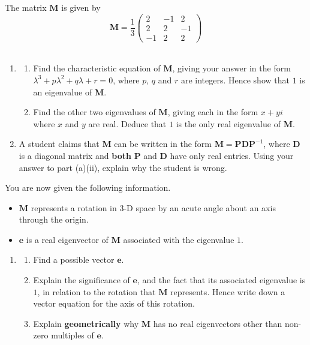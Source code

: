 \documentclass[leqno]{article}
\begin{document}
\begin{enumerate}[
  label=\textbf{\arabic*.},
  leftmargin=*,
  topsep=0pt,
  partopsep=0pt,
  parsep=0pt
]
The matrix $\mathbf{M}$ is given by
\[\mathbf{M} = \dfrac{1}{3}\begin{pmatrix} 2 & -1 & 2 \\ 2 & 2 & -1 \\ -1 & 2 & 2 \end{pmatrix}\] \\
\begin{enumerate}[label=\textbf{(\alph*)}]
  \item
  \begin{enumerate}[label=(\roman*)]
    \item Find the characteristic equation of $\mathbf{M}$, giving your answer in the form $\lambda^3 + p\lambda^2 + q\lambda + r = 0$, where $p$, $q$ and $r$ are integers. Hence show that $1$ is an eigenvalue of $\mathbf{M}$. 
    \item Find the other two eigenvalues of $\mathbf{M}$, giving each in the form $x + yi$ where $x$ and $y$ are real. Deduce that $1$ is the only real eigenvalue of $\mathbf{M}$.  \\
  \end{enumerate}
  \item A student claims that $\mathbf{M}$ can be written in the form $\mathbf{M} = \mathbf{P}\mathbf{D}\mathbf{P}^{-1}$, where $\mathbf{D}$ is a diagonal matrix and \textbf{both} $\mathbf{P}$ and $\mathbf{D}$ have only real entries. Using your answer to part (a)(ii), explain why the student is wrong.  \\
\end{enumerate}
You are now given the following information.
\begin{itemize}
  \item $\mathbf{M}$ represents a rotation in 3-D space by an acute angle about an axis through the origin.
  \item $\mathbf{e}$ is a real eigenvector of $\mathbf{M}$ associated with the eigenvalue $1$.
\end{itemize}
\begin{enumerate}[label=\textbf{(\alph*)}, resume]
  \item
  \begin{enumerate}[label=(\roman*)]
    \item Find a possible vector $\mathbf{e}$. 
    \item Explain the significance of $\mathbf{e}$, and the fact that its associated eigenvalue is $1$, in relation to the rotation that $\mathbf{M}$ represents. Hence write down a vector equation for the axis of this rotation. 
    \item Explain \textbf{geometrically} why $\mathbf{M}$ has no real eigenvectors other than non-zero multiples of $\mathbf{e}$.  \\
  \end{enumerate}
\end{enumerate}


\end{enumerate}
\end{document}
